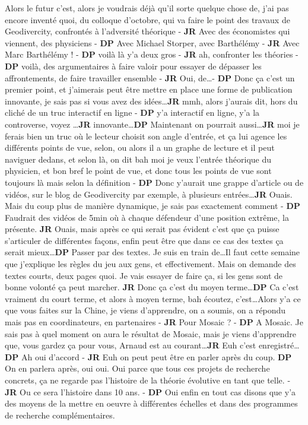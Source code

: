 \documentclass[12pt]{article}
\begin{document}
Alors le futur c'est, alors je voudrais déjà qu'il sorte quelque chose de, j'ai pas encore inventé quoi, du colloque d'octobre, qui va faire le point des travaux de Geodivercity, confrontés à l'adversité théorique - \textbf{JR} Avec des économistes qui viennent, des physiciens - \textbf{DP} Avec Michael Storper, avec Barthélémy - \textbf{JR} Avec Marc Barthélémy ! - \textbf{DP} voilà là y'a deux gros - \textbf{JR} ah, confronter les théories - \textbf{DP} voilà, des argumentaires à faire valoir pour essayer de dépasser les affrontements, de faire travailler ensemble - \textbf{JR} Oui, de\ldots - \textbf{DP} Donc ça c'est un premier point, et j'aimerais peut être mettre en place une forme de publication innovante, je sais pas si vous avez des idées\ldots \textbf{JR} mmh, alors j'aurais dit, hors du cliché de un truc interactif en ligne - \textbf{DP} y'a interactif en ligne, y'a la controverse, voyez \ldots \textbf{JR} innovante\ldots \textbf{DP} Maintenant on pourrait aussi\ldots \textbf{JR} moi je ferais bien un truc où le lecteur choisit son angle d'entrée, et ça lui agence les différents points de vue, selon, ou alors il a un graphe de lecture et il peut naviguer dedans, et selon là, on dit bah moi je veux l'entrée théorique du physicien, et bon bref le point de vue, et donc tous les points de vue sont toujours là mais selon la définition - \textbf{DP} Donc y'aurait une grappe d'article ou de vidéos, sur le blog de Geodivercity par exemple, à plusieurs entrées\ldots \textbf{JR} Ouais. Mais du coup plus de manière dynamique, je sais pas exactement comment - \textbf{DP} Faudrait des vidéos de 5min où à chaque défendeur d'une position extrême, la présente. \textbf{JR} Ouais, mais après ce qui serait pas évident c'est que ça puisse s'articuler de différentes façons, enfin peut être que dans ce cas des textes ça serait mieux\ldots \textbf{DP} Passer par des textes. Je suis en train de\ldots Il faut cette semaine que j'explique les règles du jeu aux gens, et effectivement. Mais on demande des textes courts, deux pages quoi. Je vais essayer de faire ça, si les gens sont de bonne volonté ça peut marcher. \textbf{JR} Donc ça c'est du moyen terme\ldots \textbf{DP} Ca c'est vraiment du court terme, et alors à moyen terme, bah écoutez, c'est\ldots Alors y'a ce que vous faites sur la Chine, je viens d'apprendre, on a soumis, on a répondu mais pas en coordinateurs, en partenaires - \textbf{JR} Pour Mosaic ? - \textbf{DP} A Mosaic. Je sais pas à quel moment on aura le résultat de Mosaic, mais je viens d'apprendre que, vous gardez ça pour vous, Arnaud est au courant\ldots \textbf{JR} Euh c'est enregistré\ldots \textbf{DP} Ah oui d'accord - \textbf{JR} Euh on peut peut être en parler après du coup. \textbf{DP} On en parlera après, oui oui. Oui parce que tous ces projets de recherche concrets, ça ne regarde pas l'histoire de la théorie évolutive en tant que telle. - \textbf{JR} Ou ce sera l'histoire dans 10 ans. - \textbf{DP} Oui enfin en tout cas disons que y'a des moyens de la mettre en oeuvre à différentes échelles et dans des programmes de recherche complémentaires.
\end{document}
